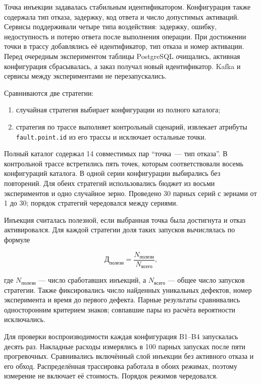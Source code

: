 \documentclass[10pt,a4paper]{article}
\begin{document}
Точка инъекции задавалась стабильным идентификатором. Конфигурация также содержала тип отказа, задержку, код ответа и число допустимых активаций. Сервисы поддерживали четыре типа воздействия: задержку, ошибку, недоступность и потерю ответа после выполнения операции. При достижении точки в трассу добавлялись её идентификатор, тип отказа и номер активации. Перед очередным экспериментом таблицы PostgreSQL очищались, активная конфигурация сбрасывалась, а заказ получал новый идентификатор. Kafka и сервисы между экспериментами не перезапускались.

Сравниваются две стратегии:

\begin{enumerate}[label=\arabic*.,leftmargin=*]
  \item случайная стратегия выбирает конфигурации из полного каталога;
  \item стратегия по трассе выполняет контрольный сценарий, извлекает атрибуты \texttt{fault.point.id} из его трассы и исключает остальные точки.
\end{enumerate}

Полный каталог содержал 14 совместимых пар ``точка~--- тип отказа''. В контрольной трассе встретились пять точек, которым соответствовали восемь конфигураций каталога. В одной серии конфигурации выбирались без повторений. Для обеих стратегий использовались бюджет из восьми экспериментов и одно случайное зерно. Проведено 30 парных серий с зернами от 1 до 30; порядок стратегий чередовался между сериями.

Инъекция считалась полезной, если выбранная точка была достигнута и отказ активировался. Для каждой стратегии доля таких запусков вычислялась по формуле

\begin{equation}
  \text{Д}_{\text{полезн}} = \frac{N_{\text{полезн}}}{N_{\text{всего}}},
\end{equation}

где $N_{\text{полезн}}$ --- число сработавших инъекций, а $N_{\text{всего}}$ --- общее число запусков стратегии. Также фиксировались число найденных уникальных дефектов, номер эксперимента и время до первого дефекта. Парные результаты сравнивались односторонним критерием знаков; совпавшие пары из расчёта вероятности исключались.

Для проверки воспроизводимости каждая конфигурация B1--B4 запускалась десять раз. Накладные расходы измерялись в 100 парных запусках после пяти прогревочных. Сравнивались включённый слой инъекции без активного отказа и его обход. Распределённая трассировка работала в обоих режимах, поэтому измерение не включает её стоимость. Порядок режимов чередовался.
\end{document}
